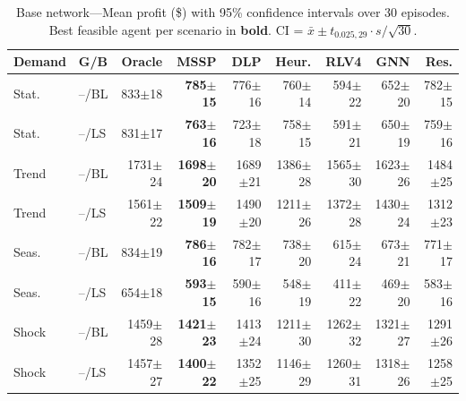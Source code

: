 \documentclass[preprint,12pt]{elsarticle}
\begin{document}
\begin{table}[htbp]
\centering
\caption{Base network---Mean profit (\$) with 95\% confidence intervals over 30 episodes.
         Best feasible agent per scenario in \textbf{bold}. CI = $\bar{x} \pm t_{0.025,29} \cdot s/\sqrt{30}$.}
\label{tab:base_results}
\small
\begin{tabular}{ll rrrrrrr}
\toprule
\textbf{Demand} & \textbf{G/B}
  & \textbf{Oracle} & \textbf{MSSP} & \textbf{DLP} & \textbf{Heur.}
  & \textbf{RLV4} & \textbf{GNN} & \textbf{Res.} \\
\midrule
Stat. & --/BL & 833{\scriptsize$\pm$18} & \textbf{785{\scriptsize$\pm$15}} & 776{\scriptsize$\pm$16} & 760{\scriptsize$\pm$14} & 594{\scriptsize$\pm$22} & 652{\scriptsize$\pm$20} & 782{\scriptsize$\pm$15} \\
Stat. & --/LS & 831{\scriptsize$\pm$17} & \textbf{763{\scriptsize$\pm$16}} & 723{\scriptsize$\pm$18} & 758{\scriptsize$\pm$15} & 591{\scriptsize$\pm$21} & 650{\scriptsize$\pm$19} & 759{\scriptsize$\pm$16} \\
Trend & --/BL & 1731{\scriptsize$\pm$24} & \textbf{1698{\scriptsize$\pm$20}} & 1689{\scriptsize$\pm$21} & 1386{\scriptsize$\pm$28} & 1565{\scriptsize$\pm$30} & 1623{\scriptsize$\pm$26} & 1484{\scriptsize$\pm$25} \\
Trend & --/LS & 1561{\scriptsize$\pm$22} & \textbf{1509{\scriptsize$\pm$19}} & 1490{\scriptsize$\pm$20} & 1211{\scriptsize$\pm$26} & 1372{\scriptsize$\pm$28} & 1430{\scriptsize$\pm$24} & 1312{\scriptsize$\pm$23} \\
Seas. & --/BL & 834{\scriptsize$\pm$19} & \textbf{786{\scriptsize$\pm$16}} & 782{\scriptsize$\pm$17} & 738{\scriptsize$\pm$20} & 615{\scriptsize$\pm$24} & 673{\scriptsize$\pm$21} & 771{\scriptsize$\pm$17} \\
Seas. & --/LS & 654{\scriptsize$\pm$18} & \textbf{593{\scriptsize$\pm$15}} & 590{\scriptsize$\pm$16} & 548{\scriptsize$\pm$19} & 411{\scriptsize$\pm$22} & 469{\scriptsize$\pm$20} & 583{\scriptsize$\pm$16} \\
Shock & --/BL & 1459{\scriptsize$\pm$28} & \textbf{1421{\scriptsize$\pm$23}} & 1413{\scriptsize$\pm$24} & 1211{\scriptsize$\pm$30} & 1262{\scriptsize$\pm$32} & 1321{\scriptsize$\pm$27} & 1291{\scriptsize$\pm$26} \\
Shock & --/LS & 1457{\scriptsize$\pm$27} & \textbf{1400{\scriptsize$\pm$22}} & 1352{\scriptsize$\pm$25} & 1146{\scriptsize$\pm$29} & 1260{\scriptsize$\pm$31} & 1318{\scriptsize$\pm$26} & 1258{\scriptsize$\pm$25} \\
\midrule

\end{tabular}
\end{table}
\end{document}
